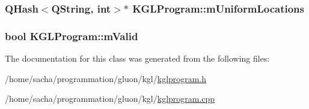 \hypertarget{class_k_g_l_program_b6b870ec76b667369f457cc980e9016c}{
\subsubsection[{mUniformLocations}]{\setlength{\rightskip}{0pt plus 5cm}QHash$<$QString, int$>$$\ast$ {\bf KGLProgram::mUniformLocations}}}
\label{class_k_g_l_program_b6b870ec76b667369f457cc980e9016c}


\hypertarget{class_k_g_l_program_f228db2a0bcddd2366e1353b25a193dc}{
\subsubsection[{mValid}]{\setlength{\rightskip}{0pt plus 5cm}bool {\bf KGLProgram::mValid}}}
\label{class_k_g_l_program_f228db2a0bcddd2366e1353b25a193dc}




The documentation for this class was generated from the following files:\begin{CompactItemize}
\item 
/home/sacha/programmation/gluon/kgl/\hyperlink{kglprogram_8h}{kglprogram.h}\item 
/home/sacha/programmation/gluon/kgl/\hyperlink{kglprogram_8cpp}{kglprogram.cpp}\end{CompactItemize}
